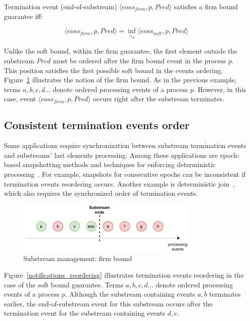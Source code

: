 \begin{definition}
Termination event (end-of-substream) $\langle eoss_{firm}, p, Pred\rangle$ satisfies a firm bound guarantee iff:

\begin{equation}
\langle eoss_{firm}, p, Pred\rangle = \inf_{<_p} \langle eoss_{soft}, p, Pred\rangle
\end{equation}
\end{definition}

Unlike the soft bound, within the firm guarantee, the first element outside the substream $Pred$ must be ordered after the firm bound event in the process $p$. This position satisfies the first possible soft bound in the events ordering. Figure~\ref{strict_guarantees} illustrates the notion of the firm bound. As in the previous example, terms $a,b,c,d...$ denote ordered processing events of a process $p$. However, in this case, event $\langle eoss_{firm}, p, Pred\rangle$ occurs right after the substream terminates.

\subsection{Consistent termination events order}
Some applications require synchronization between substream termination events and substreams' last elements processing. Among these applications are epoch-based snapshotting methods and techniques for enforcing deterministic processing~\cite{we2018adbis}. For example, snapshots for consecutive epochs can be inconsistent if termination events reordering occurs. Another example is deterministic join~\cite{gulisano2016scalejoin}, which also requires the synchronized order of termination events.

\begin{figure}[t]
  \centering
  \includegraphics[width=0.80\textwidth]{Chapters/SubstreamConsistency/pics/strict-guarantee.pdf}
  \caption{Substream management: firm bound}
  \label{strict_guarantees}
\end{figure}

Figure~\ref{notifications_reordering} illustrates termination events reordering in the case of the soft bound guarantee. Terms $a,b,c,d...$ denote ordered processing events of a process $p$. Although the substream containing events $a,b$ terminates earlier, the end-of-substream event for this substream occurs after the termination event for the substream containing events $d,e$. 

